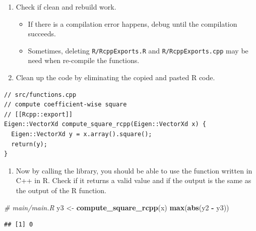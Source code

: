 \documentclass[]{book}
\newenvironment{Shaded}{\begin{snugshade}}{\end{snugshade}}
\newcommand{\KeywordTok}[1]{\textcolor[rgb]{0.13,0.29,0.53}{\textbf{#1}}}
\newcommand{\StringTok}[1]{\textcolor[rgb]{0.31,0.60,0.02}{#1}}
\newcommand{\CommentTok}[1]{\textcolor[rgb]{0.56,0.35,0.01}{\textit{#1}}}
\newcommand{\OperatorTok}[1]{\textcolor[rgb]{0.81,0.36,0.00}{\textbf{#1}}}
\newcommand{\NormalTok}[1]{#1}
\providecommand{\tightlist}{%
  \setlength{\itemsep}{0pt}\setlength{\parskip}{0pt}}
\begin{document}
\begin{enumerate}
\def\labelenumi{\arabic{enumi}.}
\setcounter{enumi}{8}
\tightlist
\item
  Check if clean and rebuild work.

  \begin{itemize}
  \tightlist
  \item
    If there is a compilation error happens, debug until the compilation
    succeeds.
  \item
    Sometimes, deleting \texttt{R/RcppExports.R} and
    \texttt{R/RcppExports.cpp} may be need when re-compile the
    functions.
  \end{itemize}
\item
  Clean up the code by eliminating the copied and pasted R code.
\end{enumerate}

\begin{verbatim}
// src/functions.cpp
// compute coefficient-wise square
// [[Rcpp::export]]
Eigen::VectorXd compute_square_rcpp(Eigen::VectorXd x) {
  Eigen::VectorXd y = x.array().square();
  return(y);
}
\end{verbatim}

\begin{enumerate}
\def\labelenumi{\arabic{enumi}.}
\setcounter{enumi}{10}
\tightlist
\item
  Now by calling the library, you should be able to use the function
  written in C++ in R. Check if it returns a valid value and if the
  output is the same as the output of the R function.
\end{enumerate}

\begin{Shaded}
\begin{Highlighting}[]
\CommentTok{# main/main.R}
\NormalTok{y3 <-}\StringTok{ }\KeywordTok{compute_square_rcpp}\NormalTok{(x)}
\KeywordTok{max}\NormalTok{(}\KeywordTok{abs}\NormalTok{(y2 }\OperatorTok{-}\StringTok{ }\NormalTok{y3))}
\end{Highlighting}
\end{Shaded}

\begin{verbatim}
## [1] 0
\end{verbatim}
\end{document}
